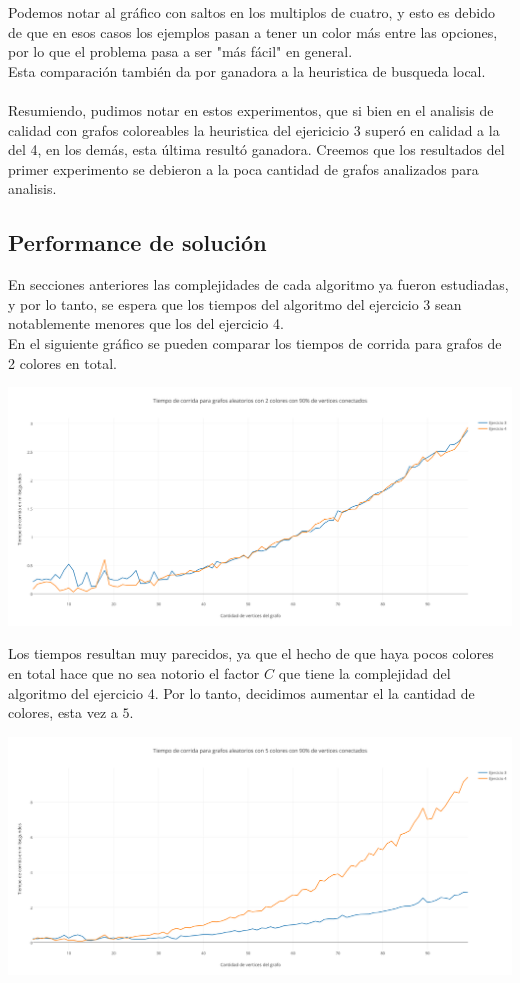 Podemos notar al gráfico con saltos en los multiplos de cuatro, y esto es debido de que en esos casos los ejemplos pasan a tener un color más entre las opciones, por lo que el problema pasa a ser "más fácil" en general. \\
Esta comparación también da por ganadora a la heuristica de busqueda local. \\ \\

Resumiendo, pudimos notar en estos experimentos, que si bien en el analisis de calidad con grafos coloreables la heuristica del ejericicio 3 superó en calidad a la del 4, en los demás, esta última resultó ganadora. Creemos que los resultados del primer experimento se debieron a la poca cantidad de grafos analizados para analisis. \\

\subsection{Performance de solución}

En secciones anteriores las complejidades de cada algoritmo ya fueron estudiadas, y por lo tanto, se espera que los tiempos del algoritmo del ejercicio 3 sean notablemente menores que los del ejercicio 4.\\

En el siguiente gráfico se pueden comparar los tiempos de corrida para grafos de 2 colores en total.

\includegraphics[scale=0.45]{./imagenes5/t2.png}

Los tiempos resultan muy parecidos, ya que el hecho de que haya pocos colores en total hace que no sea notorio el factor $C$ que tiene la complejidad del algoritmo del ejercicio 4. Por lo tanto, decidimos aumentar el la cantidad de colores, esta vez a $5$.

\includegraphics[scale=0.45]{./imagenes5/t5.png}

